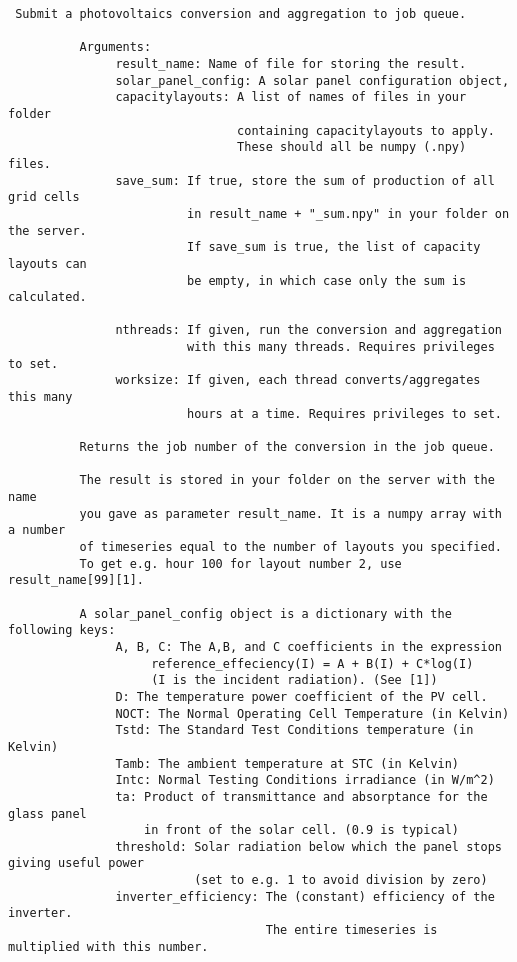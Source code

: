 \begin{verbatim}
 Submit a photovoltaics conversion and aggregation to job queue.

          Arguments:
               result_name: Name of file for storing the result.
               solar_panel_config: A solar panel configuration object,
               capacitylayouts: A list of names of files in your folder
                                containing capacitylayouts to apply.
                                These should all be numpy (.npy) files.
               save_sum: If true, store the sum of production of all grid cells
                         in result_name + "_sum.npy" in your folder on the server.
                         If save_sum is true, the list of capacity layouts can
                         be empty, in which case only the sum is calculated.
               
               nthreads: If given, run the conversion and aggregation
                         with this many threads. Requires privileges to set.
               worksize: If given, each thread converts/aggregates this many
                         hours at a time. Requires privileges to set.

          Returns the job number of the conversion in the job queue.
     
          The result is stored in your folder on the server with the name
          you gave as parameter result_name. It is a numpy array with a number
          of timeseries equal to the number of layouts you specified.
          To get e.g. hour 100 for layout number 2, use result_name[99][1]. 

          A solar_panel_config object is a dictionary with the following keys:
               A, B, C: The A,B, and C coefficients in the expression
                    reference_effeciency(I) = A + B(I) + C*log(I)
                    (I is the incident radiation). (See [1])
               D: The temperature power coefficient of the PV cell.
               NOCT: The Normal Operating Cell Temperature (in Kelvin)
               Tstd: The Standard Test Conditions temperature (in Kelvin)
               Tamb: The ambient temperature at STC (in Kelvin)
               Intc: Normal Testing Conditions irradiance (in W/m^2)
               ta: Product of transmittance and absorptance for the glass panel
                   in front of the solar cell. (0.9 is typical)
               threshold: Solar radiation below which the panel stops giving useful power
                          (set to e.g. 1 to avoid division by zero)
               inverter_efficiency: The (constant) efficiency of the inverter.
                                    The entire timeseries is multiplied with this number.


\end{verbatim}

